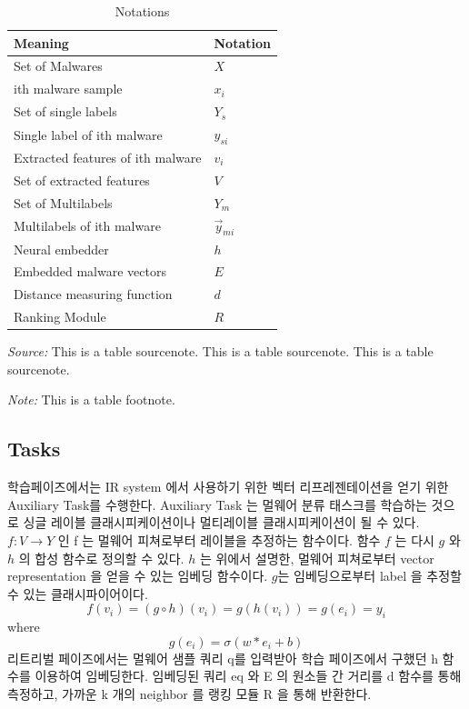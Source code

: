 \begin{table}%
\caption{Notations}
\label{tab:one}
\begin{minipage}{\columnwidth}
\begin{center}
\begin{tabular}{ll}
\toprule
Meaning & Notation\\
\midrule
  Set of Malwares     & $X$ \\
  ith malware sample  & $x_i$ \\
  Set of single labels & $Y_s$ \\
  Single label of ith malware    & $y_{si}$ \\
  Extracted features of ith malware & $v_i$ \\
  Set of extracted features   & $V$ \\
  Set of Multilabels   & $Y_m$ \\
  Multilabels of ith malware & $\vec{y}_{mi}$\\
  Neural embedder & $h$ \\
  Embedded malware vectors & $E$ \\
  Distance measuring function & $d$ \\
  Ranking Module & $R$\\
\bottomrule
\end{tabular}
\end{center}
\bigskip\centering
\footnotesize\emph{Source:} This is a table
 sourcenote. This is a table sourcenote. This is a table
 sourcenote.

 \emph{Note:} This is a table footnote.
\end{minipage}
\end{table}%


\subsection{Tasks}

학습페이즈에서는 IR system 에서 사용하기 위한 벡터 리프레젠테이션을 얻기 위한 Auxiliary Task를 수행한다. Auxiliary Task 는 멀웨어 분류 태스크를 학습하는 것으로 싱글 레이블 클래시피케이션이나 멀티레이블 클래시피케이션이 될 수 있다. $f: V \rightarrow Y $ 인 f 는 멀웨어 피쳐로부터 레이블을 추정하는 함수이다. 함수 $f$ 는 다시 $g$ 와 $h$ 의 합성 함수로 정의할 수 있다. $h$ 는 위에서 설명한, 멀웨어 피쳐로부터 vector representation 을 얻을 수 있는 임베딩 함수이다. $g$는 임베딩으로부터 label 을 추정할 수 있는 클래시파이어이다.  
\[
f(v_i) = (g \circ h)(v_i) = g(h(v_i)) = g(e_i) = y_i 
\]
where
\[
g(e_i) = \sigma (w*e_i + b) 
\]
리트리벌 페이즈에서는 멀웨어 샘플 쿼리 q를 입력받아 학습 페이즈에서 구했던 h 함수를 이용하여 임베딩한다. 임베딩된 쿼리 eq 와 E 의 원소들 간 거리를 d 함수를 통해 측정하고, 가까운 k 개의 neighbor 를 랭킹 모듈 R 을 통해 반환한다. 

